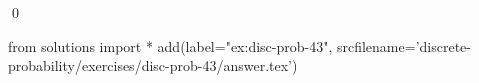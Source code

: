 
\begin{ex} 
  \label{ex:disc-prob-43}
  
  \qed
\end{ex} 
\begin{python0}
from solutions import *
add(label="ex:disc-prob-43",
    srcfilename='discrete-probability/exercises/disc-prob-43/answer.tex') 
\end{python0}
